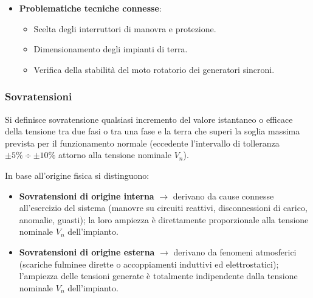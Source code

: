 \begin{itemize}
\begin{itemize}
    \end{itemize}
    \item \textbf{Problematiche tecniche connesse}:
    \begin{itemize}
        \item Scelta degli interruttori di manovra e protezione.
        \item Dimensionamento degli impianti di terra.
        \item Verifica della stabilità del moto rotatorio dei generatori sincroni.
    \end{itemize}
\end{itemize}

\subsubsection{Sovratensioni}
Si definisce sovratensione qualsiasi incremento del valore istantaneo o efficace della tensione tra due fasi o tra una fase e la terra che superi la soglia massima prevista per il funzionamento normale (eccedente l'intervallo di tolleranza $\pm 5\% \div \pm 10\%$ attorno alla tensione nominale $V_n$).

In base all'origine fisica si distinguono:
\begin{itemize}
    \item \textbf{Sovratensioni di origine interna} $\rightarrow$ derivano da cause connesse all'esercizio del sistema (manovre su circuiti reattivi, disconnessioni di carico, anomalie, guasti); la loro ampiezza è direttamente proporzionale alla tensione nominale $V_n$ dell'impianto.
    \item \textbf{Sovratensioni di origine esterna} $\rightarrow$ derivano da fenomeni atmosferici (scariche fulminee dirette o accoppiamenti induttivi ed elettrostatici); l'ampiezza delle tensioni generate è totalmente indipendente dalla tensione nominale $V_n$ dell'impianto.
\end{itemize}

